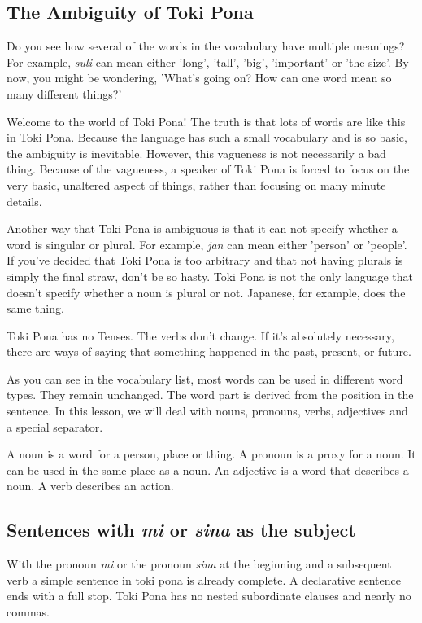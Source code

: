 \subsection*{The Ambiguity of Toki Pona}
%
Do you see how several of the words in the vocabulary have multiple meanings? 
For example, \textit{suli} can mean either 'long', 'tall', 'big', 'important' or 'the size'. 
By now, you might be wondering, 'What's going on? How can one word mean so many different things?' 

Welcome to the world of Toki Pona! The truth is that lots of words are like this in Toki Pona. 
Because the language has such a small vocabulary and is so basic, the ambiguity is inevitable. 
However, this vagueness is not necessarily a bad thing. Because of the vagueness, a speaker of Toki Pona is forced to focus on the very basic, unaltered aspect of things, rather than focusing on many minute details. 

Another way that Toki Pona is ambiguous is that it can not specify whether a word is singular or plural. 
For example, \textit{jan} can mean either 'person' or 'people'. 
If you've decided that Toki Pona is too arbitrary and that not having plurals is simply the final straw, don't be so hasty. 
Toki Pona is not the only language that doesn't specify whether a noun is plural or not. 
Japanese, for example, does the same thing. 

Toki Pona has no Tenses. 
The verbs don't change. 
If it's absolutely necessary, there are ways of saying that something happened in the past, present, or future. 

As you can see in the vocabulary list, most words can be used in different word types. 
They remain unchanged. 
The word part is derived from the position in the sentence. 
In this lesson, we will deal with nouns, pronouns, verbs, adjectives and a special separator. 

A noun is a word for a person, place or thing. 
A pronoun is a proxy for a noun. It can be used in the same place as a noun. 
An adjective is a word that describes a noun. 
A verb describes an action. 
% 
\label{'predicate'}
\subsection*{Sentences with \textit{mi} or \textit{sina }as the subject}
%
With the pronoun \textit{mi} or the pronoun \textit{sina} at the beginning and a subsequent verb a simple sentence in toki pona is already complete. 
A declarative sentence ends with a full stop. 
Toki Pona has no nested subordinate clauses and nearly no commas. 

